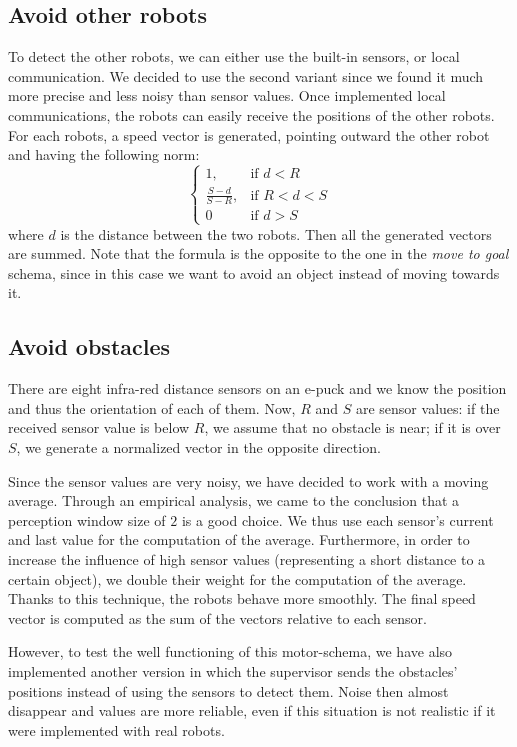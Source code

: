 \documentclass[journal]{IEEEtran}
\begin{document}
\subsection{Avoid other robots}
To detect the other robots, we can either use the built-in sensors, or local communication. We decided to use the second variant since we found it much more precise and less noisy than sensor values. Once implemented local communications, the robots can easily receive the
positions of the other robots. For each robots, a speed vector is generated, pointing outward the other robot and having the following norm:
\begin{equation}
\begin{cases} 1, & \mbox{if }  d<R \\ \frac{S-d}{S-R}, & \mbox{if }
  R<d<S \\ 0 & \mbox{if } d>S\end{cases}
\end{equation}
where $d$ is the distance between the two robots. Then all the generated vectors
are summed. Note that the formula is the opposite to the one in the
\textit{move to goal} schema, since in this case we want to avoid an object
instead of moving towards it.

\subsection{Avoid obstacles}
There are eight infra-red distance sensors on an e-puck and we know the position and thus the orientation of each of them. Now, $R$ and $S$ are sensor values: if the received sensor value is below $R$, we assume that no obstacle is near; if it is over $S$, we generate a normalized vector in the opposite direction. 

Since the sensor values are very noisy, we have decided to work with a moving average. Through an empirical analysis, we came to the conclusion that a perception window size of $2$ is a good choice. We thus use each sensor's current and last value for the computation of the average. Furthermore, in order to increase the influence of high sensor values (representing a short distance to a certain object), we double their weight for the computation of the average. Thanks to this technique, the robots behave more smoothly. The final speed vector is computed as the sum of the vectors relative to each sensor.

However, to test the well functioning of this motor-schema, we have also implemented another version in which the supervisor sends the obstacles' positions instead of using the sensors to detect them. Noise then almost disappear and values are more reliable, even if this situation is not realistic if it were implemented with real robots. 
\end{document}
